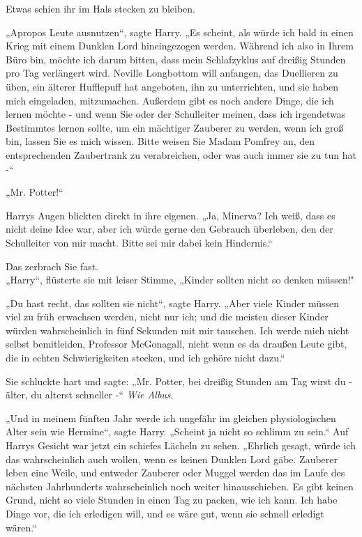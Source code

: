 {Etwas schien ihr im Hals stecken zu bleiben.

„Apropos Leute ausnutzen“, sagte Harry. „Es scheint, als würde ich bald in einen Krieg mit einem Dunklen Lord hineingezogen werden. Während ich also in Ihrem Büro bin, möchte ich darum bitten, dass mein Schlafzyklus auf dreißig Stunden pro Tag verlängert wird. Neville Longbottom will anfangen, das Duellieren zu üben, ein älterer Hufflepuff hat angeboten, ihn zu unterrichten, und sie haben mich eingeladen, mitzumachen. Außerdem gibt es noch andere Dinge, die ich lernen möchte - und wenn Sie oder der Schulleiter meinen, dass ich irgendetwas Bestimmtes lernen sollte, um ein mächtiger Zauberer zu werden, wenn ich groß bin, lassen Sie es mich wissen. Bitte weisen Sie Madam Pomfrey an, den entsprechenden Zaubertrank zu verabreichen, oder was auch immer sie zu tun hat -“

„Mr. Potter!“

Harrys Augen blickten direkt in ihre eigenen. „Ja, Minerva? Ich weiß, dass es nicht deine Idee war, aber ich würde gerne den Gebrauch überleben, den der Schulleiter von mir macht. Bitte sei mir dabei kein Hindernis.“

Das zerbrach Sie fast.\\ „Harry“, flüsterte sie mit leiser Stimme, „Kinder sollten nicht so denken müssen!"

„Du hast recht, das sollten sie nicht“, sagte Harry. „Aber viele Kinder müssen viel zu früh erwachsen werden, nicht nur ich; und die meisten dieser Kinder würden wahrscheinlich in fünf Sekunden mit mir tauschen. Ich werde mich nicht selbst bemitleiden, Professor McGonagall, nicht wenn es da draußen Leute gibt, die in echten Schwierigkeiten stecken, und ich gehöre nicht dazu.“

Sie schluckte hart und sagte: „Mr. Potter, bei dreißig Stunden am Tag wirst du - älter, du alterst schneller -“ \emph{Wie Albus}.

„Und in meinem fünften Jahr werde ich ungefähr im gleichen physiologischen Alter sein wie Hermine“, sagte Harry. „Scheint ja nicht so schlimm zu sein.“ Auf Harrys Gesicht war jetzt ein schiefes Lächeln zu sehen. „Ehrlich gesagt, würde ich das wahrscheinlich auch wollen, wenn es keinen Dunklen Lord gäbe. Zauberer leben eine Weile, und entweder Zauberer oder Muggel werden das im Laufe des nächsten Jahrhunderts wahrscheinlich noch weiter hinausschieben. Es gibt keinen Grund, nicht so viele Stunden in einen Tag zu packen, wie ich kann. Ich habe Dinge vor, die ich erledigen will, und es wäre gut, wenn sie schnell erledigt wären.“

}
